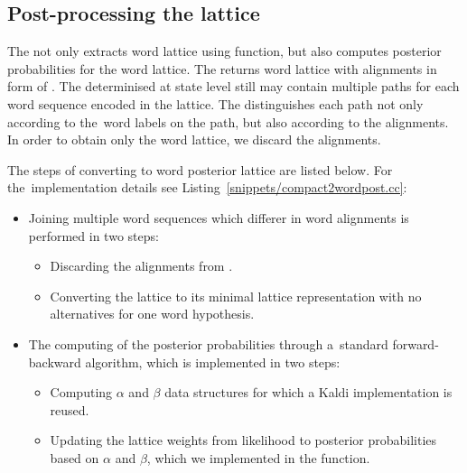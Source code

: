 \subsection{Post-processing the lattice}
\label{sub:postprocess}
The  not only extracts word lattice using  function, but also computes posterior probabilities for the word lattice.
The  returns word lattice with alignments in form of .
The  determinised at state level still may contain multiple paths for each word sequence encoded in the lattice.
The  distinguishes each path not only according to the~word labels on the path, but also according to the alignments.
In order to obtain only the word lattice,  we discard the alignments. 

%

The steps of converting  to word posterior lattice are listed below.
For the~implementation details see Listing~\ref{snippets/compact2wordpost.cc}:
\begin{itemize}
    \item Joining multiple word sequences which differer in word alignments is performed in two steps:
    \begin{itemize}
        \item Discarding the alignments from .
        \item Converting the lattice to its minimal lattice representation with no alternatives for one word hypothesis. 
    \end{itemize}
    \item The computing of the posterior probabilities through a~standard forward-backward algorithm, which is implemented in two steps:
    \begin{itemize}
        \item Computing $\alpha$ and $\beta$ data structures for which a Kaldi implementation is reused.
        \item Updating the lattice weights from likelihood to posterior probabilities based on $\alpha$ and $\beta$, which we implemented in the  function.
    \end{itemize}
\end{itemize}

